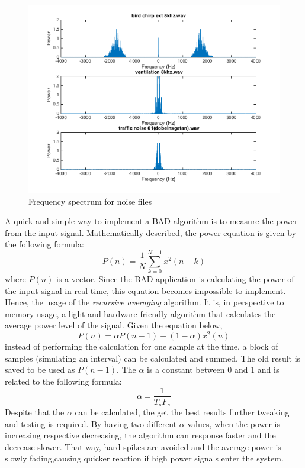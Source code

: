 \begin{figure}
  \centering
  \includegraphics[width=1\textwidth]{sections/freq_spec_noise_linkaxis.png}
  \caption{Frequency spectrum for noise files}
  \label{fig:noise_spec}
\end{figure}

A quick and simple way to implement a BAD algorithm is to measure the power from the input signal.
Mathematically described, the power equation is given by the following formula: 
\[
P(n) = \frac{1}{N} \sum\limits_{k=0}^{N-1} x^2(n-k)
\]
where $P(n)$ is a vector. Since the BAD application is calculating the power of the input signal in 
real-time, this equation becomes impossible to implement. Hence, the usage of the \emph{recursive
averaging} algorithm. It is, in perspective to memory usage, a light and hardware friendly algorithm 
that calculates the average power level of the signal. Given the equation below,
\[
P(n) = \alpha P(n-1)+(1-\alpha)x^2(n)
\]
instead of performing the calculation for one sample at the time, a block of samples (simulating an interval) can be calculated and summed.
The old result is saved to be used as $P(n-1)$. The $\alpha$ is a constant between 0 and 1 and is related to the 
following formula:
\[
\alpha = \frac{1}{T_{s}F_{s}}
\]
Despite that the $\alpha$ can be calculated, the get the best results further tweaking and testing is required.
By having two different $\alpha$ values, when the power is increasing respective decreasing, the algorithm
can response faster and the decrease slower. That way, hard spikes are avoided and the average power is slowly
fading,causing quicker reaction if high power signals enter the system.

